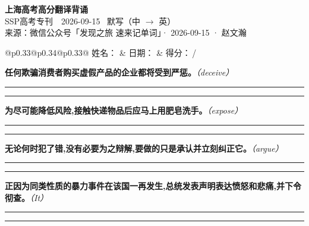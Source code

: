 \documentclass[11pt,a4paper]{article}
\newcommand{\num}[1]{\makebox[1.9em][r]{#1.}\hspace{0.3em}}
\newcommand{\wline}{\noindent\rule{\linewidth}{0.4pt}}
\newcommand{\prompt}[1]{\emph{\textcolor{tipblue}{\small（#1）}}}
\begin{document}
\pagestyle{plain}
\begin{center}
{\LARGE\bfseries 上海高考高分翻译背诵 }\\[0.25em]
{\large SSP高考专刊　2026-09-15 \quad\ 默写（中 $\to$ 英）}\\[0.35em]
{\footnotesize 来源：微信公众号「发现之旅 速来记单词」· 2026-09-15 · 赵文瀚}
\end{center}

\vspace{0.4em}
\noindent\begin{tabular}{@{}p{0.33\textwidth}@{}p{0.34\textwidth}@{}p{0.33\textwidth}@{}}
姓名：\underline{\hspace{2.0cm}} & 日期：\underline{\hspace{2.0cm}} & 得分：\underline{\hspace{1.4cm}}\,/ \\
\end{tabular}

\vspace{0.5em}

\vspace{0.8em}
\num{1}\textbf{任何欺骗消费者购买虚假产品的企业都将受到严惩。}\prompt{deceive}

\vspace{0.3em}

\wline\vspace{0.3em}
\wline

\num{2}\textbf{为尽可能降低风险,接触快递物品后应马上用肥皂洗手。}\prompt{expose}

\vspace{0.3em}

\wline\vspace{0.3em}
\wline

\num{3}\textbf{无论何时犯了错,没有必要为之辩解,要做的只是承认并立刻纠正它。}\prompt{argue}

\vspace{0.3em}

\wline\vspace{0.3em}
\wline

\num{4}\textbf{正因为同类性质的暴力事件在该国一再发生,总统发表声明表达愤怒和悲痛,并下令彻查。}\prompt{It}

\vspace{0.3em}

\wline\vspace{0.3em}
\wline
\end{document}
